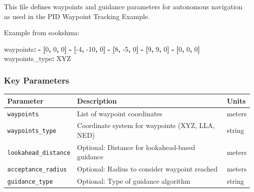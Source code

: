 \documentclass[
  letterpaper,
  DIV=11,
  numbers=noendperiod]{scrreprt}
\newenvironment{Shaded}{\begin{snugshade}}{\end{snugshade}}
\newcommand{\AttributeTok}[1]{\textcolor[rgb]{0.40,0.45,0.13}{#1}}
\newcommand{\DecValTok}[1]{\textcolor[rgb]{0.68,0.00,0.00}{#1}}
\newcommand{\FunctionTok}[1]{\textcolor[rgb]{0.28,0.35,0.67}{#1}}
\newcommand{\KeywordTok}[1]{\textcolor[rgb]{0.00,0.23,0.31}{\textbf{#1}}}
\begin{document}
This file defines waypoints and guidance parameters for autonomous
navigation as used in the PID Waypoint Tracking Example.

Example from sookshma:

\begin{Shaded}
\begin{Highlighting}[]
\FunctionTok{waypoints}\KeywordTok{:}
\KeywordTok{{-}}\AttributeTok{ }\KeywordTok{[}\DecValTok{0}\KeywordTok{,}\AttributeTok{ }\DecValTok{0}\KeywordTok{,}\AttributeTok{ }\DecValTok{0}\KeywordTok{]}
\KeywordTok{{-}}\AttributeTok{ }\KeywordTok{[}\DecValTok{{-}4}\KeywordTok{,}\AttributeTok{ }\DecValTok{{-}10}\KeywordTok{,}\AttributeTok{ }\DecValTok{0}\KeywordTok{]}
\KeywordTok{{-}}\AttributeTok{ }\KeywordTok{[}\DecValTok{8}\KeywordTok{,}\AttributeTok{ }\DecValTok{{-}5}\KeywordTok{,}\AttributeTok{ }\DecValTok{0}\KeywordTok{]}
\KeywordTok{{-}}\AttributeTok{ }\KeywordTok{[}\DecValTok{9}\KeywordTok{,}\AttributeTok{ }\DecValTok{9}\KeywordTok{,}\AttributeTok{ }\DecValTok{0}\KeywordTok{]}
\KeywordTok{{-}}\AttributeTok{ }\KeywordTok{[}\DecValTok{0}\KeywordTok{,}\AttributeTok{ }\DecValTok{0}\KeywordTok{,}\AttributeTok{ }\DecValTok{0}\KeywordTok{]}
\FunctionTok{waypoints\_type}\KeywordTok{:}\AttributeTok{ XYZ}
\end{Highlighting}
\end{Shaded}

\subsubsection*{Key Parameters}\label{key-parameters-8}

\begin{longtable}[]{@{}
  >{\raggedright\arraybackslash}p{}
  >{\raggedright\arraybackslash}p{}
  >{\raggedright\arraybackslash}p{}@{}}
\toprule\noalign{}
\begin{minipage}[b]{\linewidth}\raggedright
Parameter
\end{minipage} & \begin{minipage}[b]{\linewidth}\raggedright
Description
\end{minipage} & \begin{minipage}[b]{\linewidth}\raggedright
Units
\end{minipage} \\
\midrule\noalign{}
\endhead
\bottomrule\noalign{}
\endlastfoot
\texttt{waypoints} & List of waypoint coordinates & meters \\
\texttt{waypoints\_type} & Coordinate system for waypoints (XYZ, LLA,
NED) & string \\
\texttt{lookahead\_distance} & Optional: Distance for lookahead-based
guidance & meters \\
\texttt{acceptance\_radius} & Optional: Radius to consider waypoint
reached & meters \\
\texttt{guidance\_type} & Optional: Type of guidance algorithm &
string \\
\end{longtable}
\end{document}

